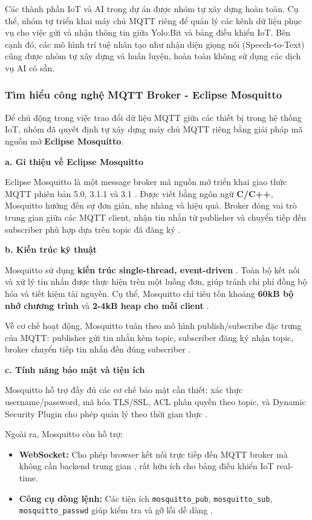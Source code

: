 Các thành phần IoT và AI trong dự án được nhóm tự xây dựng hoàn toàn. Cụ thể, nhóm tự triển khai máy chủ MQTT riêng để quản lý các kênh dữ liệu phục vụ cho việc gửi và nhận thông tin giữa Yolo:Bit và bảng điều khiển IoT. Bên cạnh đó, các mô hình trí tuệ nhân tạo như nhận diện giọng nói (Speech-to-Text) cũng được nhóm tự xây dựng và huấn luyện, hoàn toàn không sử dụng các dịch vụ AI có sẵn.

\subsubsection{Tìm hiểu công nghệ MQTT Broker - Eclipse Mosquitto}

Để chủ động trong việc trao đổi dữ liệu MQTT giữa các thiết bị trong hệ thống IoT, nhóm đã quyết định tự xây dựng máy chủ MQTT riêng bằng giải pháp mã nguồn mở \textbf{Eclipse Mosquitto}.

\textbf{a. Gi thiệu về Eclipse Mosquitto}

Eclipse Mosquitto là một message broker mã nguồn mở triển khai giao thức MQTT phiên bản 5.0, 3.1.1 và 3.1 . Được viết bằng ngôn ngữ \textbf{C/C++}, Mosquitto hướng đến sự đơn giản, nhẹ nhàng và hiệu quả. Broker đóng vai trò trung gian giữa các MQTT client, nhận tin nhắn từ publisher và chuyển tiếp đến subscriber phù hợp dựa trên topic đã đăng ký .

\textbf{b. Kiến trúc kỹ thuật}

Mosquitto sử dụng \textbf{kiến trúc single-thread, event-driven} . Toàn bộ kết nối và xử lý tin nhắn được thực hiện trên một luồng đơn, giúp tránh chi phí đồng bộ hóa và tiết kiệm tài nguyên. Cụ thể, Mosquitto chỉ tiêu tốn khoảng \textbf{60kB bộ nhớ chương trình} và \textbf{2-4kB heap cho mỗi client} .

Về cơ chế hoạt động, Mosquitto tuân theo mô hình publish/subscribe đặc trưng của MQTT: publisher gửi tin nhắn kèm topic, subscriber đăng ký nhận topic, broker chuyển tiếp tin nhắn đến đúng subscriber .

\textbf{c. Tính năng bảo mật và tiện ích}

Mosquitto hỗ trợ đầy đủ các cơ chế bảo mật cần thiết: xác thực username/password, mã hóa TLS/SSL, ACL phân quyền theo topic, và Dynamic Security Plugin cho phép quản lý theo thời gian thực .

Ngoài ra, Mosquitto còn hỗ trợ:
\begin{itemize}
    \item \textbf{WebSocket:} Cho phép browser kết nối trực tiếp đến MQTT broker mà không cần backend trung gian , rất hữu ích cho bảng điều khiển IoT real-time.
    \item \textbf{Công cụ dòng lệnh:} Các tiện ích \texttt{mosquitto\_pub}, \texttt{mosquitto\_sub}, \texttt{mosquitto\_passwd} giúp kiểm tra và gỡ lỗi dễ dàng .
\end{itemize}

